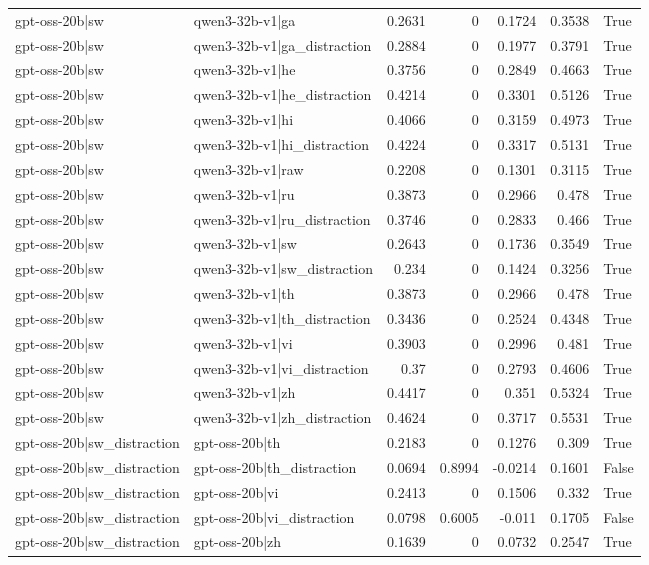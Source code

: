 \begin{table}
\begin{tabular}{l l r r r r l}
gpt-oss-20b|sw & qwen3-32b-v1|ga & 0.2631 & 0 & 0.1724 & 0.3538 & True \\
gpt-oss-20b|sw & qwen3-32b-v1|ga_distraction & 0.2884 & 0 & 0.1977 & 0.3791 & True \\
gpt-oss-20b|sw & qwen3-32b-v1|he & 0.3756 & 0 & 0.2849 & 0.4663 & True \\
gpt-oss-20b|sw & qwen3-32b-v1|he_distraction & 0.4214 & 0 & 0.3301 & 0.5126 & True \\
gpt-oss-20b|sw & qwen3-32b-v1|hi & 0.4066 & 0 & 0.3159 & 0.4973 & True \\
gpt-oss-20b|sw & qwen3-32b-v1|hi_distraction & 0.4224 & 0 & 0.3317 & 0.5131 & True \\
gpt-oss-20b|sw & qwen3-32b-v1|raw & 0.2208 & 0 & 0.1301 & 0.3115 & True \\
gpt-oss-20b|sw & qwen3-32b-v1|ru & 0.3873 & 0 & 0.2966 & 0.478 & True \\
gpt-oss-20b|sw & qwen3-32b-v1|ru_distraction & 0.3746 & 0 & 0.2833 & 0.466 & True \\
gpt-oss-20b|sw & qwen3-32b-v1|sw & 0.2643 & 0 & 0.1736 & 0.3549 & True \\
gpt-oss-20b|sw & qwen3-32b-v1|sw_distraction & 0.234 & 0 & 0.1424 & 0.3256 & True \\
gpt-oss-20b|sw & qwen3-32b-v1|th & 0.3873 & 0 & 0.2966 & 0.478 & True \\
gpt-oss-20b|sw & qwen3-32b-v1|th_distraction & 0.3436 & 0 & 0.2524 & 0.4348 & True \\
gpt-oss-20b|sw & qwen3-32b-v1|vi & 0.3903 & 0 & 0.2996 & 0.481 & True \\
gpt-oss-20b|sw & qwen3-32b-v1|vi_distraction & 0.37 & 0 & 0.2793 & 0.4606 & True \\
gpt-oss-20b|sw & qwen3-32b-v1|zh & 0.4417 & 0 & 0.351 & 0.5324 & True \\
gpt-oss-20b|sw & qwen3-32b-v1|zh_distraction & 0.4624 & 0 & 0.3717 & 0.5531 & True \\
gpt-oss-20b|sw_distraction & gpt-oss-20b|th & 0.2183 & 0 & 0.1276 & 0.309 & True \\
gpt-oss-20b|sw_distraction & gpt-oss-20b|th_distraction & 0.0694 & 0.8994 & -0.0214 & 0.1601 & False \\
gpt-oss-20b|sw_distraction & gpt-oss-20b|vi & 0.2413 & 0 & 0.1506 & 0.332 & True \\
gpt-oss-20b|sw_distraction & gpt-oss-20b|vi_distraction & 0.0798 & 0.6005 & -0.011 & 0.1705 & False \\
gpt-oss-20b|sw_distraction & gpt-oss-20b|zh & 0.1639 & 0 & 0.0732 & 0.2547 & True \\

\end{tabular}
\end{table}
